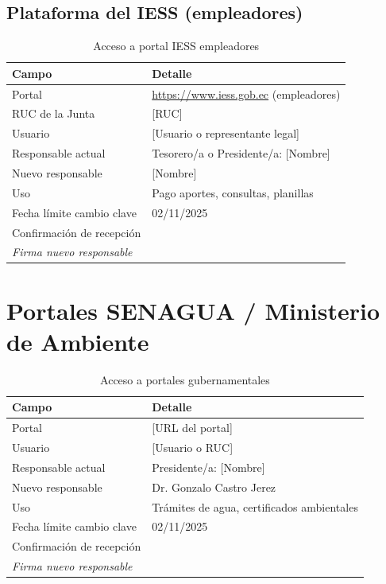 \subsection*{Plataforma del IESS (empleadores)}

\begin{table}[H]
\centering
\caption{Acceso a portal IESS empleadores}
\label{tab:acceso-iess}
\begin{tabularx}{\textwidth}{@{}lX@{}}
\toprule
\textbf{Campo} & \textbf{Detalle} \\
\midrule
Portal & \url{https://www.iess.gob.ec} (empleadores) \\
RUC de la Junta & [RUC] \\
Usuario & [Usuario o representante legal] \\
Responsable actual & Tesorero/a o Presidente/a: [Nombre] \\
Nuevo responsable & [Nombre] \\
Uso & Pago aportes, consultas, planillas \\
Fecha límite cambio clave & 02/11/2025 \\
Confirmación de recepción & \underline{\hspace{5cm}} \\ \emph{Firma nuevo responsable} \\
\bottomrule
\end{tabularx}
\end{table}

\section{Portales SENAGUA / Ministerio de Ambiente}

\begin{table}[H]
\centering
\caption{Acceso a portales gubernamentales}
\label{tab:acceso-senagua}
\begin{tabularx}{\textwidth}{@{}lX@{}}
\toprule
\textbf{Campo} & \textbf{Detalle} \\
\midrule
Portal & [URL del portal] \\
Usuario & [Usuario o RUC] \\
Responsable actual & Presidente/a: [Nombre] \\
Nuevo responsable & Dr. Gonzalo Castro Jerez \\
Uso & Trámites de agua, certificados ambientales \\
Fecha límite cambio clave & 02/11/2025 \\
Confirmación de recepción & \underline{\hspace{5cm}} \\ \emph{Firma nuevo responsable} \\
\bottomrule
\end{tabularx}
\end{table}

